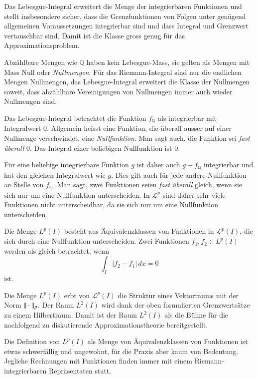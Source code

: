Das Lebesgue-Integral erweitert die Menge der integrierbaren Funktionen
und stellt insbesondere sicher, dass die Grenzfunktionen von Folgen
unter genügend allgemeinen Voraussetzungen integrierbar sind und dass
Integral und Grenzwert vertauschbar sind.
Damit ist die Klasse gross genug für das Approximationsproblem.

Abzählbare Mengen wie $\mathbb Q$ haben kein Lebesgue-Mass, sie
gelten als Mengen mit Mass Null oder {\em Nullmengen}.
%
Für das Riemann-Integral sind nur die endlichen Mengen Nullmengen,
das Lebesgue-Integral erweitert die Klasse der Nullmengen soweit,
dass abzählbare Vereinigungen von Nullmengen immer auch wieder
Nullmengen sind.

Das Lebesgue-Integral betrachtet die Funktion $f_{\mathbb Q}$ 
als integrierbar mit Integralwert $0$.
Allgemein heisst eine Funktion, die überall ausser auf einer Nullmenge
verschwindet, eine {\em Nullfunktion}.
Man sagt auch, die Funktion sei {\em fast überall} $0$.
Das Integral einer beliebigen Nullfunktion ist $0$.

Für eine beliebige integrierbare Funktion $g$ ist daher auch 
$g+f_{\mathbb Q}$ integrierbar und hat den gleichen Integralwert
wie $g$.
Dies gilt auch für jede andere Nullfunktion an Stelle von $f_{\mathbb Q}$.
Man sagt, zwei Funktionen seien {\em fast überall} gleich, wenn sie sich
nur um eine Nullfunktion unterscheiden.
%
In $\mathcal{L}^p$ sind daher sehr viele Funktionen nicht unterscheidbar,
da sie sich nur um eine Nullfunktion unterscheiden.

\begin{definition}
%
Die Menge $L^p(I)$ besteht aus Äquivalenzklassen von Funktionen in
$\mathcal{L}^p(I)$, die sich durch eine Nullfunktion unterscheiden.
Zwei Funktionen $f_1,f_2\in L^p(I)$ werden als gleich betrachtet,
wenn
\[
\int_I
|f_2-f_1|
\,dx
=0
\]
ist.
\end{definition}

Die Menge $L^p(I)$ erbt von $\mathcal{L}^p(I)$ die Struktur eines
Vektorraums mit der Norm $\|\mathstrut\cdot\mathstrut\|_p$.
Der Raum $L^2(I)$ wird dank der oben formulierten Grenzwertsätze zu
einem Hilbertraum.
Damit ist der Raum $L^2(I)$ als die Bühne für die nachfolgend zu diskutierende
Approximationstheorie bereitgestellt.

Die Definition von $L^p(I)$ als Menge von Äquivalenzklassen von Funktionen
ist etwas schwerfällig und ungewohnt, für die Praxis aber kaum von Bedeutung.
Jegliche Rechnungen mit Funktionen finden immer mit einem
Riemann-integrierbaren Repräsentaten statt.


